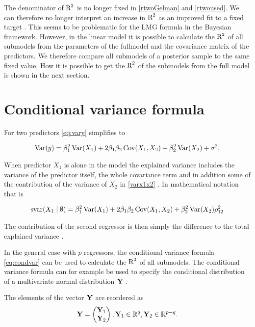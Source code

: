 \documentclass[11pt,a4paper,twoside]{book}
\begin{document}
 The denominator of $\text{R}^2$ is no longer fixed in \eqref{rtwoGelman} and \eqref{rtwoused}. We can therefore no longer interpret an increase in $\text{R}^2$ as an improved fit to a fixed target \citep{Gelman2017}. This seems to be problematic for the LMG formula in the Bayesian framework. However, in the linear model it is possible to calculate the $\text{R}^2$ of all submodels from the parameters of the fullmodel and the covariance matrix of the predictors. We therefore compare all submodels of a posterior sample to the same fixed value. How it is possible to get the $\text{R}^2$ of the submodels from the full model is shown in the next section.

\section{Conditional variance formula}


For two predictors \eqref{eq:vary} simplifies to

      \begin{align} 
        \operatorname{Var}(y) = \beta_{1}^2 \operatorname{Var}(X_{1}) + 2  \beta_{1}  \beta_{2} \operatorname{Cov}(X_{1}, X_{2}) + \beta_{2}^2 \operatorname{Var}(X_{2}) + \sigma^2, \label{varx1x2} 
   \end{align}
 
 When predictor $X_{1}$ is alone in the model the explained variance includes the variance of the predictor itself, the whole covariance term and in addition some of the contribution of the variance of $X_{2}$ in \eqref{varx1x2} . In mathematical notation that is
 
      \begin{align} 
        \text{svar}({X_{1}} \mid \emptyset ) = \beta_{1}^2 \operatorname{Var}(X_{1}) + 2  \beta_{1}  \beta_{2} \operatorname{Cov}(X_{1}, X_{2}) + \beta_{2}^2 \operatorname{Var}(X_{2}) \rho_{12}^2 \nonumber 
   \end{align}
   
The contribution of the second regressor is then simply the difference to the total explained variance \citep{Gromping2007}. 

In the general case with $p$ regressors, the conditional variance formula \eqref{eq:condvar} can be used to calculate the $\text{R}^2$ of all submodels. The conditional variance formula can for example be used to specify the conditional distribution of a multivariate normal distribution ${\mathbf{Y}}$ .

The elements of the vector ${\mathbf{Y}}$ are reordered as
\begin{align*}
\mathbf{Y} = \begin{pmatrix}
\mathbf{Y}_{1} \\ 
\mathbf{Y}_{2} \end{pmatrix}, \mathbf{Y}_{1} \in {\mathbb{R}}^q, \mathbf{Y}_{2} \in {\mathbb{R}}^{p-q} .
\end{align*}
\end{document}
